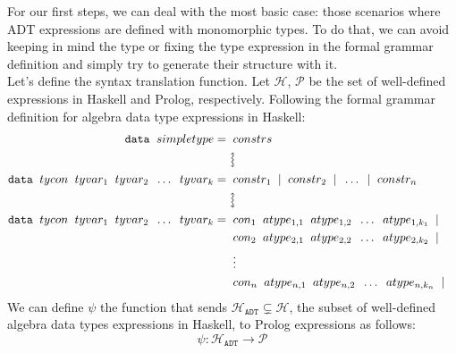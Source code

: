 \documentclass{report}
\theoremstyle{definition}
\theoremstyle{definition}
\newcommand{\ttt}[1]{\texttt{#1}}
\newcommand{\tav}{\;\;}
\newcommand{\updownsquigarrow}{\mathrel{\rotatebox[origin=c]{-90}{$\leftrightsquigarrow$}}}
\begin{document}
For our first steps, we can deal with the most basic case: those scenarios where ADT expressions are defined with monomorphic types. To do that, we can avoid keeping in mind the type or fixing the type expression in the formal grammar definition and simply try to generate their structure with it.\\

Let's define the syntax translation function. Let $\mathcal{H}$, $\mathcal{P}$ be the set of well-defined expressions in Haskell and Prolog, respectively. Following the formal grammar definition for algebra data type expressions in Haskell:
\begin{align*}
	\ttt{data} \tav simpletype =                                                & \tav constrs                                                                       &   &   \\
	                                                                            & \updownsquigarrow                                                                  &   &   \\
	\ttt{data} \tav tycon \tav tyvar_1 \tav tyvar_2 \tav \ldots \tav tyvar_k 	= & \tav constr_1 \tav | \tav constr_2 \tav | \tav \ldots \tav | \tav constr_n         &   &   \\
	                                                                            & \updownsquigarrow                                                                  &   &   \\
	\ttt{data} \tav tycon \tav tyvar_1 \tav tyvar_2 \tav \ldots \tav tyvar_k 	= & \tav con_1 \tav atype_{1,1} \tav atype_{1,2} \tav \ldots \tav atype_{1,k_1} \tav | &   &   \\
	                                                                            & \tav con_2 \tav atype_{2,1} \tav atype_{2,2} \tav \ldots \tav atype_{2,k_2} \tav | &   &   \\
	                                                                            & \tav \vdots \tav                                                                   &   &   \\
	                                                                            & \tav con_n \tav atype_{n,1} \tav atype_{n,2} \tav \ldots \tav atype_{n,k_n} \tav | &   &   \\
\end{align*}
We can define $\psi$ the function that sends $\mathcal{H}_{\ttt{ADT}} \subsetneq \mathcal{H}$, the subset of well-defined algebra data types expressions in Haskell, to Prolog expressions as follows: $$\psi: \mathcal{H}_{\ttt{ADT}} \longrightarrow \mathcal{P} $$
\end{document}
